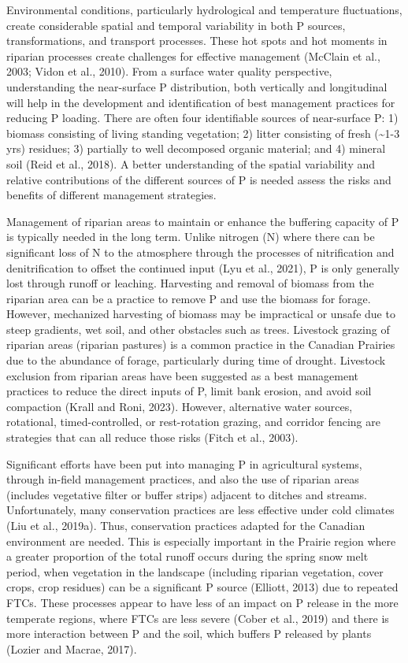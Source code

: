 \documentclass[
]{agujournal2019}
\begin{document}
Environmental conditions, particularly hydrological and temperature
fluctuations, create considerable spatial and temporal variability in
both P sources, transformations, and transport processes. These hot
spots and hot moments in riparian processes create challenges for
effective management (McClain et al., 2003; Vidon et al., 2010). From a
surface water quality perspective, understanding the near-surface P
distribution, both vertically and longitudinal will help in the
development and identification of best management practices for reducing
P loading. There are often four identifiable sources of near-surface P:
1) biomass consisting of living standing vegetation; 2) litter
consisting of fresh (\textasciitilde1-3 yrs) residues; 3) partially to
well decomposed organic material; and 4) mineral soil (Reid et al.,
2018). A better understanding of the spatial variability and relative
contributions of the different sources of P is needed assess the risks
and benefits of different management strategies.

Management of riparian areas to maintain or enhance the buffering
capacity of P is typically needed in the long term. Unlike nitrogen (N)
where there can be significant loss of N to the atmosphere through the
processes of nitrification and denitrification to offset the continued
input (Lyu et al., 2021), P is only generally lost through runoff or
leaching. Harvesting and removal of biomass from the riparian area can
be a practice to remove P and use the biomass for forage. However,
mechanized harvesting of biomass may be impractical or unsafe due to
steep gradients, wet soil, and other obstacles such as trees. Livestock
grazing of riparian areas (riparian pastures) is a common practice in
the Canadian Prairies due to the abundance of forage, particularly
during time of drought. Livestock exclusion from riparian areas have
been suggested as a best management practices to reduce the direct
inputs of P, limit bank erosion, and avoid soil compaction (Krall and
Roni, 2023). However, alternative water sources, rotational,
timed-controlled, or rest-rotation grazing, and corridor fencing are
strategies that can all reduce those risks (Fitch et al., 2003).

Significant efforts have been put into managing P in agricultural
systems, through in-field management practices, and also the use of
riparian areas (includes vegetative filter or buffer strips) adjacent to
ditches and streams. Unfortunately, many conservation practices are less
effective under cold climates (Liu et al., 2019a). Thus, conservation
practices adapted for the Canadian environment are needed. This is
especially important in the Prairie region where a greater proportion of
the total runoff occurs during the spring snow melt period, when
vegetation in the landscape (including riparian vegetation, cover crops,
crop residues) can be a significant P source (Elliott, 2013) due to
repeated FTCs. These processes appear to have less of an impact on P
release in the more temperate regions, where FTCs are less severe (Cober
et al., 2019) and there is more interaction between P and the soil,
which buffers P released by plants (Lozier and Macrae, 2017).
\end{document}
